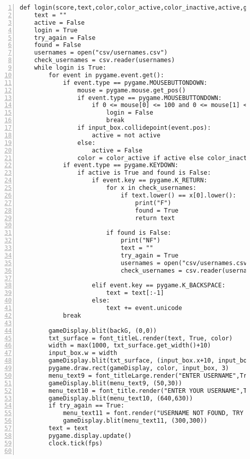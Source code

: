 \documentclass[12pt]{report}
\begin{document}
\begin{Verbatim}[numbers=left, frame=single]
def login(score,text,color,color_active,color_inactive,active,gameDisplay,fps):
    text = ""
    active = False
    login = True
    try_again = False
    found = False
    usernames = open("csv/usernames.csv")
    check_usernames = csv.reader(usernames)
    while login is True:
        for event in pygame.event.get():
            if event.type == pygame.MOUSEBUTTONDOWN:
                mouse = pygame.mouse.get_pos()
                if event.type == pygame.MOUSEBUTTONDOWN:
                    if 0 <= mouse[0] <= 100 and 0 <= mouse[1] <= 100:
                        login = False
                        break
                if input_box.collidepoint(event.pos):
                    active = not active
                else:
                    active = False
                color = color_active if active else color_inactive
            if event.type == pygame.KEYDOWN:
                if active is True and found is False:
                    if event.key == pygame.K_RETURN:
                        for x in check_usernames:
                            if text.lower() == x[0].lower():
                                print("F")
                                found = True
                                return text
                            
                        if found is False:
                            print("NF")
                            text = ""
                            try_again = True
                            usernames = open("csv/usernames.csv")
                            check_usernames = csv.reader(usernames)
                        
                    elif event.key == pygame.K_BACKSPACE:
                        text = text[:-1]
                    else:
                        text += event.unicode
            break
        
        gameDisplay.blit(backG, (0,0))
        txt_surface = font_titleL.render(text, True, color)                                        
        width = max(1000, txt_surface.get_width()+10)                                       
        input_box.w = width
        gameDisplay.blit(txt_surface, (input_box.x+10, input_box.y+5))                      
        pygame.draw.rect(gameDisplay, color, input_box, 3)
        menu_text9 = font_titleLarge.render("ENTER USERNAME",True,white)
        gameDisplay.blit(menu_text9, (50,30))
        menu_text10 = font_title.render("ENTER YOUR USERNAME",True,white)
        gameDisplay.blit(menu_text10, (640,630))
        if try_again == True:
            menu_text11 = font.render("USERNAME NOT FOUND, TRY AGAIN",True,white)
            gameDisplay.blit(menu_text11, (300,300))
        text = text
        pygame.display.update()                                                                 
        clock.tick(fps)


\end{Verbatim}
\end{document}

